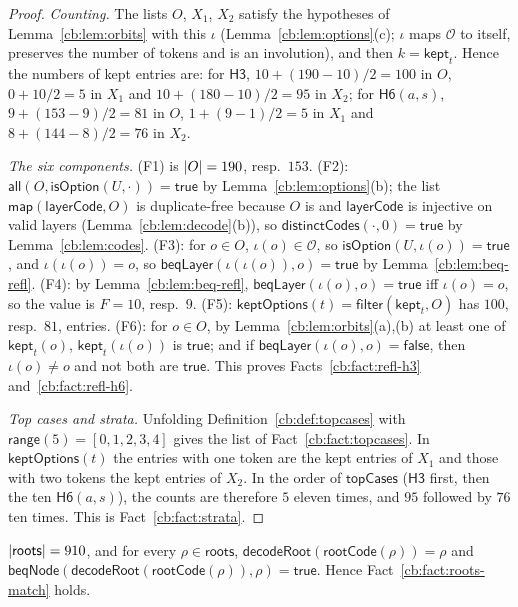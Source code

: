 \begin{proof}
\emph{Counting.} The lists $O$, $X_1$, $X_2$ satisfy the hypotheses of Lemma~\ref{cb:lem:orbits} with this $\iota$
(Lemma~\ref{cb:lem:options}(c); $\iota$ maps $\mathcal O$ to itself, preserves the number of tokens and is an
involution), and then $k=\mathsf{kept}_t$. Hence the numbers of kept entries are:
for $\mathsf{H3}$, $10+(190-10)/2=100$ in $O$, $0+10/2=5$ in $X_1$ and $10+(180-10)/2=95$ in $X_2$;
for $\mathsf{H6}(a,s)$, $9+(153-9)/2=81$ in $O$, $1+(9-1)/2=5$ in $X_1$ and $8+(144-8)/2=76$ in $X_2$.

\emph{The six components.} (F1) is $\lvert O\rvert=190$, resp.\ $153$. (F2): $\mathsf{all}(O,\mathsf{isOption}(U,\cdot))=
\mathsf{true}$ by Lemma~\ref{cb:lem:options}(b); the list $\mathsf{map}(\mathsf{layerCode},O)$ is duplicate-free
because $O$ is and $\mathsf{layerCode}$ is injective on valid layers (Lemma~\ref{cb:lem:decode}(b)), so
$\mathsf{distinctCodes}(\cdot,0)=\mathsf{true}$ by Lemma~\ref{cb:lem:codes}. (F3): for $o\in O$, $\iota(o)\in\mathcal O$,
so $\mathsf{isOption}(U,\iota(o))=\mathsf{true}$, and $\iota(\iota(o))=o$, so $\mathsf{beqLayer}(\iota(\iota(o)),o)=
\mathsf{true}$ by Lemma~\ref{cb:lem:beq-refl}. (F4): by Lemma~\ref{cb:lem:beq-refl},
$\mathsf{beqLayer}(\iota(o),o)=\mathsf{true}$ iff $\iota(o)=o$, so the value is $F=10$, resp.\ $9$. (F5):
$\mathsf{keptOptions}(t)=\mathsf{filter}(\mathsf{kept}_t,O)$ has $100$, resp.\ $81$, entries. (F6): for $o\in O$, by
Lemma~\ref{cb:lem:orbits}(a),(b) at least one of $\mathsf{kept}_t(o)$, $\mathsf{kept}_t(\iota(o))$ is $\mathsf{true}$;
and if $\mathsf{beqLayer}(\iota(o),o)=\mathsf{false}$, then $\iota(o)\ne o$ and not both are $\mathsf{true}$. This
proves Facts~\ref{cb:fact:refl-h3} and~\ref{cb:fact:refl-h6}.

\emph{Top cases and strata.} Unfolding Definition~\ref{cb:def:topcases} with $\mathsf{range}(5)=[0,1,2,3,4]$ gives the
list of Fact~\ref{cb:fact:topcases}. In $\mathsf{keptOptions}(t)$ the entries with one token are the kept entries of
$X_1$ and those with two tokens the kept entries of $X_2$. In the order of $\mathsf{topCases}$ ($\mathsf{H3}$ first,
then the ten $\mathsf{H6}(a,s)$), the counts are therefore $5$ eleven times, and $95$ followed by $76$ ten times. This
is Fact~\ref{cb:fact:strata}.
\end{proof}

\begin{proposition}\label{cb:prop:roots-match}
$\lvert\mathsf{roots}\rvert=910$, and for every $\rho\in\mathsf{roots}$,
$\mathsf{decodeRoot}(\mathsf{rootCode}(\rho))=\rho$ and
$\mathsf{beqNode}(\mathsf{decodeRoot}(\mathsf{rootCode}(\rho)),\rho)=\mathsf{true}$. Hence
Fact~\ref{cb:fact:roots-match} holds.
\end{proposition}

